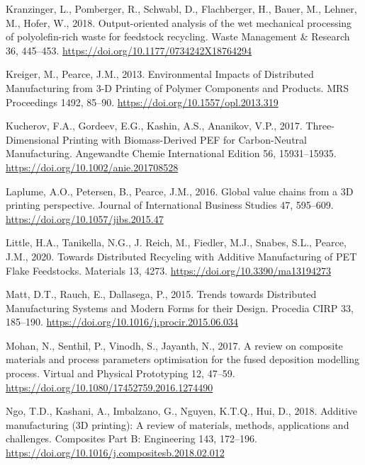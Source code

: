 \documentclass[
  11pt,
]{article}
\newlength{\cslhangindent}
\newlength{\cslentryspacingunit} %
\newenvironment{CSLReferences}[2] %
 {%
  \setlength{\parindent}{0pt}
  \ifodd #1
  \let\oldpar\par
  \def\par{\hangindent=\cslhangindent\oldpar}
  \fi
  \setlength{\parskip}{#2\cslentryspacingunit}
 }%
 {}
\begin{document}
\begin{CSLReferences}{1}{0}
\leavevmode{}%
Kranzinger, L., Pomberger, R., Schwabl, D., Flachberger, H., Bauer, M.,
Lehner, M., Hofer, W., 2018. Output-oriented analysis of the wet
mechanical processing of polyolefin-rich waste for feedstock recycling.
Waste Management \& Research 36, 445--453.
\url{https://doi.org/10.1177/0734242X18764294}

\leavevmode{}%
Kreiger, M., Pearce, J.M., 2013. Environmental {Impacts} of {Distributed
Manufacturing} from 3-{D Printing} of {Polymer Components} and
{Products}. MRS Proceedings 1492, 85--90.
\url{https://doi.org/10.1557/opl.2013.319}

\leavevmode{}%
Kucherov, F.A., Gordeev, E.G., Kashin, A.S., Ananikov, V.P., 2017.
Three-{Dimensional Printing} with {Biomass-Derived PEF} for
{Carbon-Neutral Manufacturing}. Angewandte Chemie International Edition
56, 15931--15935. \url{https://doi.org/10.1002/anie.201708528}

\leavevmode{}%
Laplume, A.O., Petersen, B., Pearce, J.M., 2016. Global value chains
from a {3D} printing perspective. Journal of International Business
Studies 47, 595--609. \url{https://doi.org/10.1057/jibs.2015.47}

\leavevmode{}%
Little, H.A., Tanikella, N.G., J. Reich, M., Fiedler, M.J., Snabes,
S.L., Pearce, J.M., 2020. Towards {Distributed Recycling} with {Additive
Manufacturing} of {PET Flake Feedstocks}. Materials 13, 4273.
\url{https://doi.org/10.3390/ma13194273}

\leavevmode{}%
Matt, D.T., Rauch, E., Dallasega, P., 2015. Trends towards {Distributed
Manufacturing Systems} and {Modern Forms} for their {Design}. Procedia
CIRP 33, 185--190. \url{https://doi.org/10.1016/j.procir.2015.06.034}

\leavevmode{}%
Mohan, N., Senthil, P., Vinodh, S., Jayanth, N., 2017. A review on
composite materials and process parameters optimisation for the fused
deposition modelling process. Virtual and Physical Prototyping 12,
47--59. \url{https://doi.org/10.1080/17452759.2016.1274490}

\leavevmode{}%
Ngo, T.D., Kashani, A., Imbalzano, G., Nguyen, K.T.Q., Hui, D., 2018.
Additive manufacturing ({3D} printing): {A} review of materials,
methods, applications and challenges. Composites Part B: Engineering
143, 172--196. \url{https://doi.org/10.1016/j.compositesb.2018.02.012}


\end{CSLReferences}
\end{document}
